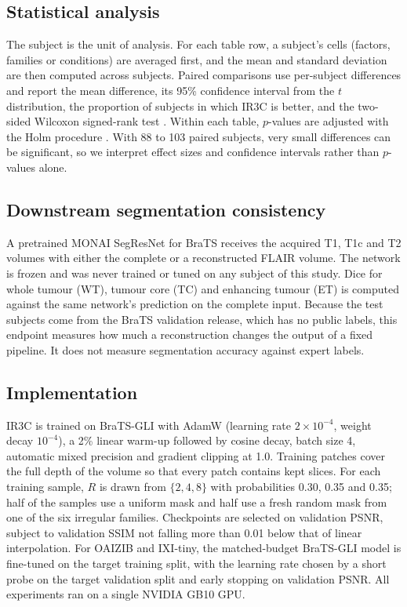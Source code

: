\documentclass[a4paper,fleqn]{cas-dc}
\begin{document}
\subsection{Statistical analysis}
\label{sec:stats}

The subject is the unit of analysis. For each table row, a subject's cells (factors,
families or conditions) are averaged first, and the mean and standard deviation are then
computed across subjects. Paired comparisons use per-subject differences and report the mean
difference, its 95\% confidence interval from the $t$ distribution, the proportion of subjects
in which IR3C is better, and the two-sided Wilcoxon signed-rank test \citep{wilcoxon1945}.
Within each table, $p$-values are adjusted with the Holm procedure \citep{holm1979}. With 88
to 103 paired subjects, very small differences can be significant, so we interpret effect
sizes and confidence intervals rather than $p$-values alone.

\subsection{Downstream segmentation consistency}
\label{sec:downstream-setup}

A pretrained MONAI SegResNet \citep{myronenko2019segresnet,cardoso2022monai} for BraTS
receives the acquired T1, T1c and T2 volumes with either the complete or a reconstructed
FLAIR volume. The network is frozen and was never trained or tuned on any subject of this
study. Dice for whole tumour (WT), tumour core (TC) and enhancing tumour (ET) is computed
against the same network's prediction on the complete input. Because the test subjects come
from the BraTS validation release, which has no public labels, this endpoint measures how
much a reconstruction changes the output of a fixed pipeline. It does not measure
segmentation accuracy against expert labels.

\subsection{Implementation}
\label{sec:impl}

IR3C is trained on BraTS-GLI with AdamW (learning rate $2\times10^{-4}$, weight decay
$10^{-4}$), a 2\% linear warm-up followed by cosine decay, batch size 4, automatic mixed
precision and gradient clipping at 1.0. Training patches cover the full depth of the volume
so that every patch contains kept slices. For each training sample, $R$ is drawn from
$\{2,4,8\}$ with probabilities 0.30, 0.35 and 0.35; half of the samples use a uniform mask
and half use a fresh random mask from one of the six irregular families. Checkpoints are
selected on validation PSNR, subject to validation SSIM not falling more than 0.01 below that
of linear interpolation. For OAIZIB and IXI-tiny, the matched-budget BraTS-GLI model is
fine-tuned on the target training split, with the learning rate chosen by a short probe on
the target validation split and early stopping on validation PSNR. All experiments ran on a
single NVIDIA GB10 GPU.
\end{document}
